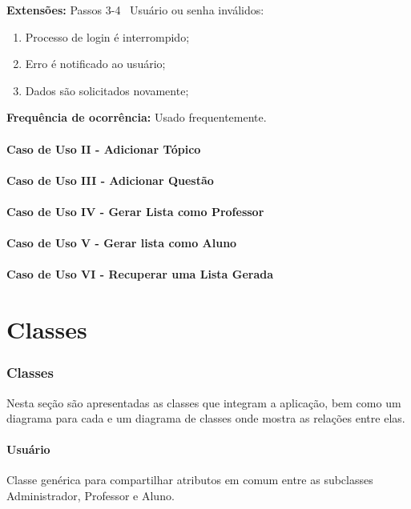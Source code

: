\documentclass[12pt,oneside,a4paper,article]{abntex2}
\begin{document}
		\textbf{Extensões:} Passos 3-4 \textrightarrow \ Usuário ou senha inválidos:
		
		\begin{enumerate}[label=\alph*.]	
			\item Processo de login é interrompido;
			\item Erro é notificado ao usuário;
			\item Dados são solicitados novamente;
		\end{enumerate}
		
		\textbf{Frequência de ocorrência:} Usado frequentemente.
	
		\subsection{Caso de Uso II - Adicionar Tópico}
	
		\subsection{Caso de Uso III - Adicionar Questão}
	
		\subsection{Caso de Uso IV - Gerar Lista como Professor}
	
		\subsection{Caso de Uso V - Gerar lista como Aluno}
	
		\subsection{Caso de Uso VI - Recuperar uma Lista Gerada}

\part{Classes}
	\section{Classes}
		Nesta seção são apresentadas as classes que integram a aplicação, bem como um diagrama para cada e um diagrama de classes onde mostra
		as relações entre elas.
		
		\subsection{Usuário}
			Classe genérica para compartilhar atributos em comum entre as subclasses Administrador, Professor e Aluno.
	
\end{document}
